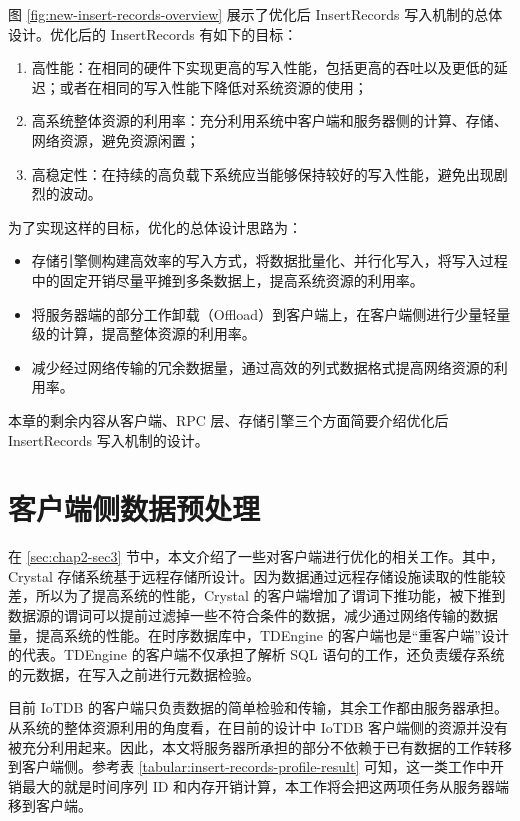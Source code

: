 图 \ref{fig:new-insert-records-overview} 展示了优化后 InsertRecords 写入机制的总体设计。优化后的 InsertRecords 有如下的目标：
\begin{enumerate}
  \item 高性能：在相同的硬件下实现更高的写入性能，包括更高的吞吐以及更低的延迟；或者在相同的写入性能下降低对系统资源的使用；
  \item 高系统整体资源的利用率：充分利用系统中客户端和服务器侧的计算、存储、网络资源，避免资源闲置；
  \item 高稳定性：在持续的高负载下系统应当能够保持较好的写入性能，避免出现剧烈的波动。
\end{enumerate}
为了实现这样的目标，优化的总体设计思路为：
\begin{itemize}
  \item 存储引擎侧构建高效率的写入方式，将数据批量化、并行化写入，将写入过程中的固定开销尽量平摊到多条数据上，提高系统资源的利用率。
  \item 将服务器端的部分工作卸载（Offload）到客户端上，在客户端侧进行少量轻量级的计算，提高整体资源的利用率。
  \item 减少经过网络传输的冗余数据量，通过高效的列式数据格式提高网络资源的利用率。
\end{itemize}
本章的剩余内容从客户端、RPC 层、存储引擎三个方面简要介绍优化后 InsertRecords 写入机制的设计。

\section{客户端侧数据预处理}
在 \ref{sec:chap2-sec3} 节中，本文介绍了一些对客户端进行优化的相关工作。其中， Crystal 存储系统基于远程存储所设计\cite{durner2021crystal}。因为数据通过远程存储设施读取的性能较差，所以为了提高系统的性能，Crystal 的客户端增加了谓词下推功能，被下推到数据源的谓词可以提前过滤掉一些不符合条件的数据，减少通过网络传输的数据量，提高系统的性能。在时序数据库中，TDEngine 的客户端也是“重客户端”设计的代表。TDEngine 的客户端不仅承担了解析 SQL 语句的工作，还负责缓存系统的元数据，在写入之前进行元数据检验。

目前 IoTDB 的客户端只负责数据的简单检验和传输，其余工作都由服务器承担。从系统的整体资源利用的角度看，在目前的设计中 IoTDB 客户端侧的资源并没有被充分利用起来。因此，本文将服务器所承担的部分不依赖于已有数据的工作转移到客户端侧。参考表 \ref{tabular:insert-records-profile-result} 可知，这一类工作中开销最大的就是时间序列 ID 和内存开销计算，本工作将会把这两项任务从服务器端移到客户端。

